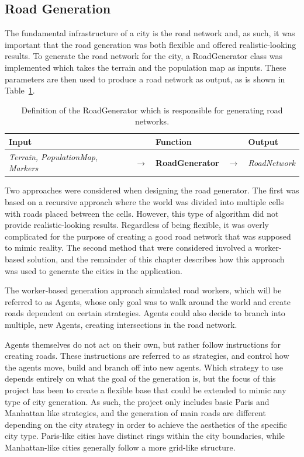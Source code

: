 \subsection{Road Generation}
The fundamental infrastructure of a city is the road network and, as such, it was important that the road generation was both flexible and offered realistic-looking results.
To generate the road network for the city, a RoadGenerator class was implemented which takes the terrain and the population map as inputs.
These parameters are then used to produce a road network as output, as is shown in Table~\ref{table:def_roadgen}.

\begin{table}[H]
  \centering
  \begin{tabular}{lllll}
    \textbf{Input} & & \textbf{Function} & & \textbf{Output} \\
    \midrule
    \textit{Terrain, PopulationMap, Markers} & $\rightarrow$ & \textbf{RoadGenerator} & $\rightarrow$ & \textit{RoadNetwork} \\
    \bottomrule
  \end{tabular}

  \caption{Definition of the RoadGenerator which is responsible for generating road networks.}
  \label{table:def_roadgen}
\end{table}
\vspace{-0.4cm}

Two approaches were considered when designing the road generator.
The first was based on a recursive approach where the world was divided into multiple cells with roads placed between the cells.
However, this type of algorithm did not provide realistic-looking results. Regardless of being flexible, it was overly complicated for the purpose of creating a good road network that was supposed to mimic reality.
The second method that were considered involved a worker-based solution, and the remainder of this chapter describes how this approach was used to generate the cities in the application.

The worker-based generation approach simulated road workers, which will be referred to as Agents, whose only goal was to walk around the world and create roads dependent on certain strategies.
Agents could also decide to branch into multiple, new Agents, creating intersections in the road network.

Agents themselves do not act on their own, but rather follow instructions for creating roads. These instructions are referred to as strategies, and control how the agents move, build and branch off into new agents.
Which strategy to use depends entirely on what the goal of the generation is, but the focus of this project has been to create a flexible base that could be extended to mimic any type of city generation.
As such, the project only includes basic Paris and Manhattan like strategies, and the generation of main roads are different depending on the city strategy in order to achieve the aesthetics of the specific city type.
Paris-like cities have distinct rings within the city boundaries, while Manhattan-like cities generally follow a more grid-like structure.

